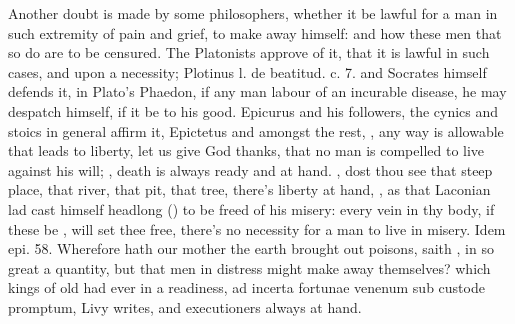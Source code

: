 Another doubt is made by some philosophers, whether it be lawful for a
man in such extremity of pain and grief, to make away himself: and how
these men that so do are to be censured. The Platonists approve of it,
that it is lawful in such cases, and upon a necessity; Plotinus l. de
beatitud. c. 7. and Socrates himself defends it, in Plato's Phaedon, if
any man labour of an incurable disease, he may despatch himself, if it
be to his good. Epicurus and his followers, the cynics and stoics in
general affirm it, Epictetus and \Seneca{} amongst the rest,
, any way is allowable that
leads to liberty, let us give God thanks, that no man is
compelled to live against his will;  , death is always ready and at
hand. , dost thou see that
steep place, that river, that pit, that tree, there's liberty at hand,
, as that Laconian lad cast himself
headlong () to be freed of his misery: every
vein in thy body, if these be , will set thee free,
 there's no necessity for a
man to live in misery.  Idem epi. 58. Wherefore hath our mother
the earth brought out poisons, saith \Pliny{}, in so great a
quantity, but that men in distress might make away themselves? which
kings of old had ever in a readiness, ad incerta fortunae venenum sub
custode promptum, Livy writes, and executioners always at hand.

